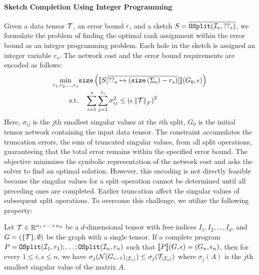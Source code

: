 \paragraph{Sketch Completion Using Integer Programming}
%
Given a data tensor $\mathcal{T}$, an error bound $\epsilon$, and a sketch $S = \overline{\mathtt{OSplit}(\mathcal{I}_s, ??_s)}$, we formulate the problem of finding the optimal rank assignment within the error bound as an integer programming problem.
%
Each hole in the sketch is assigned an integer variable $r_s$.
%
The network cost and the error bound requirements are encoded as follows:
\begin{equation}
\begin{aligned}
    \min_{r_1, r_2, \ldots, r_s} &\mathtt{size}\left(\llbracket S[\overline{??_s \mapsto (\mathtt{size}\left(\Sigma_s\right) - r_s)}] \rrbracket(G_0, \epsilon)\right) \\
    \text{s.t.} & \quad \sum_{i=1}^{s}\sum_{j=1}^{r_i} \sigma_{ij}^2 \leq \left(\epsilon\left\lVert\mathcal{T}\right\rVert_{F}\right)^2
\end{aligned}
\label{eqn:ip}
\end{equation}
Here, $\sigma_{ij}$ is the $j$th smallest singular values at the $i$th split, $G_0$ is the initial tensor network containing the input data tensor.
%
The constraint accumulates the truncation errors, \ie the sum of truncated singular values, from all split operations, guaranteeing that the total error remains within the specified error bound.
%
The objective minimizes the symbolic representation of the network cost and asks the solver to find an optimal solution.
%
However, this encoding is not directly feasible because the singular values for a split operation cannot be determined until all preceding ones are completed.
%
Earlier truncation affect the singular values of subsequent split operations.
%
To overcome this challenge, we utilize the following property:
\begin{theorem}\label{thm:rank-bound}
Let $\mathcal{T} \in \mathbb{R}^{n_1 \times \cdots \times n_d}$ be a $d$-dimensional tensor with free indices $I_1, I_2, \ldots, I_d$, and $G=(\{\mathcal{T}\},\emptyset)$ be the graph with a single tensor.
%
If a complete program $P = \mathtt{OSplit}(\mathcal{I}_1, r_1); \ldots; \mathtt{OSplit}(\mathcal{I}_n, r_n)$ such that $\llbracket P \rrbracket(G, \epsilon) = (G_n, \epsilon_n)$,
then for every $1 \leq i, s \leq n$, we have $\sigma_j(\mathcal{N}(G_{i-1})_{\langle\mathcal{I}_s\rangle}) \leq \sigma_j(\mathcal{T}_{\langle\mathcal{I}_s\rangle})$ where $\sigma_j(A)$ is the $j$th smallest singular value of the matrix $A$.
\end{theorem}


